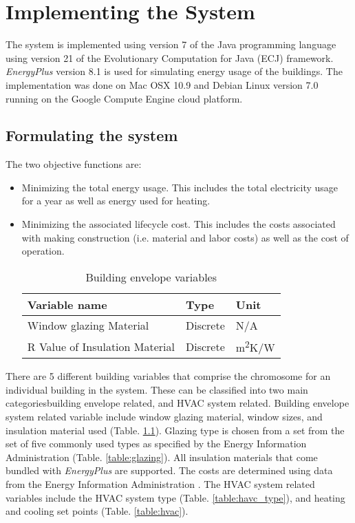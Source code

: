 %
%
%
\chapter{Implementing the System} \label{ch:method}
The system is implemented using version 7 of the Java programming language using version 21 of the Evolutionary Computation for Java (ECJ) framework. \textit{EnergyPlus} version 8.1 is used for simulating energy usage of the buildings. The implementation was done on Mac OSX 10.9 and Debian Linux version 7.0 running on the Google Compute Engine cloud platform.

\section{Formulating the system}

The two objective functions are:
\begin{itemize}
\item Minimizing the total energy usage. This includes the total electricity usage for a year as well as energy used for heating.
\item Minimizing the associated lifecycle cost. This includes the costs associated with making construction (i.e. material and labor costs) as well as the cost of operation.

\begin{table}[htbp]
    \centering
    \begin{tabular}{|l|l|l|}
    \hline
    Variable name                  & Type       & Unit                      \\ \hline
    Window glazing Material        & Discrete   & N/A                      \\
    R Value of Insulation Material & Discrete   & m\textsuperscript{2}K/W   \\ \hline
    \end{tabular}
    \caption{Building envelope variables }
    \label{table:envelope}
\end{table}

\end{itemize}

There are 5 different building variables that comprise the chromosome for an individual building in the system. These can be classified into two main categories\textemdash building envelope related, and HVAC system related. Building envelope system related variable include window glazing material, window sizes, and insulation material used (Table. \ref{table:envelope}). Glazing type is chosen from a set from the set of five commonly used types as specified by the Energy Information Administration (Table. \ref{table:glazing}). All insulation materials that come bundled with \textit{EnergyPlus} are supported. The costs are determined using data from the Energy Information Administration \cite{eia}. The HVAC system related variables include the HVAC system type (Table. \ref{table:havc_type}), and heating and cooling set points (Table. \ref{table:hvac}).

